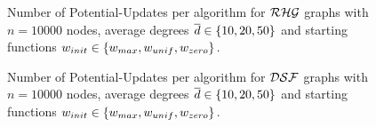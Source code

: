 \begin{figure}
  \centering
  \caption{
      Number of Potential-Updates per algorithm for $\mathcal{RHG}$ graphs with $n = 10000$ nodes, average degrees $\overline{d} \in \left\{10, 20, 50\right\}$ and starting functions $w_{init} \in \left\{w_{max}, w_{unif}, w_{zero}\right\}$.
  }
  \label{fig:app_pot_rhg}
\end{figure}

\begin{figure}
  \centering
  \caption{
      Number of Potential-Updates per algorithm for $\mathcal{DSF}$ graphs with $n = 10000$ nodes, average degrees $\overline{d} \in \left\{10, 20, 50\right\}$ and starting functions $w_{init} \in \left\{w_{max}, w_{unif}, w_{zero}\right\}$.
  }
  \label{fig:app_pot_dsf}
\end{figure}

